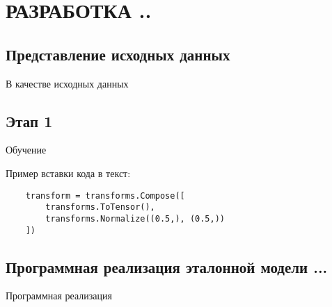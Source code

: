 \chapter[Разработка ...]
{РАЗРАБОТКА ..}

\section{Представление исходных данных}\par
\hspace*{12.5 mm}В качестве исходных данных 

\section{Этап 1}
\hspace*{12.5 mm}Обучение 

Пример вставки кода в текст:
\small
\fontsize{12pt}{12pt}\selectfont
\begin{verbatim}
    transform = transforms.Compose([
        transforms.ToTensor(),
        transforms.Normalize((0.5,), (0.5,))
    ])
\end{verbatim}
\normalsize
\fontsize{14pt}{14pt}\selectfont

\section{Программная реализация эталонной модели ...}
\hspace*{12.5 mm}Программная реализация 

